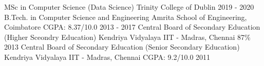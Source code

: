 \begin{cventries}
  \cventry
    {MSc in Computer Science (Data Science)}
    {Trinity College of Dublin}
    {\empty}
    {2019 - 2020}
    {\empty}
  \cventry
    {B.Tech. in Computer Science and Engineering}
    {Amrita School of Engineering, Coimbatore}
    {CGPA: 8.37/10.0}
    {2013 - 2017}
    {\empty}
  \cventry
    {Central Board of Secondary Education (Higher Sceondry Education)}
    {Kendriya Vidyalaya IIT - Madras, Chennai}
    {87\%}
    {2013}
    {\empty}
  \cventry
    {Central Board of Secondary Education (Senior Secondary Education)}
    {Kendriya Vidyalaya IIT - Madras, Chennai}
    {CGPA: 9.2/10.0}
    {2011}
    {\empty}
\end{cventries}
